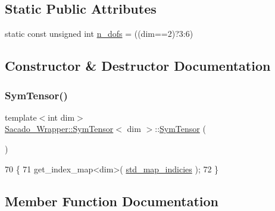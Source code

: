 \subsection*{Static Public Attributes}
\begin{DoxyCompactItemize}
\item 
static const unsigned int \hyperlink{classSacado__Wrapper_1_1SymTensor_a733bc4b029ff8d067b48e7ce3ee7606b}{n\+\_\+dofs} = ((dim==2)?3\+:6)
\end{DoxyCompactItemize}


\subsection{Constructor \& Destructor Documentation}
\mbox{\label{classSacado__Wrapper_1_1SymTensor_a4e7ec32177eb891e3f1a32a16bcd59f5}} 
\subsubsection{\texorpdfstring{Sym\+Tensor()}{SymTensor()}}
{\footnotesize\ttfamily template$<$int dim$>$ \\
\hyperlink{classSacado__Wrapper_1_1SymTensor}{Sacado\+\_\+\+Wrapper\+::\+Sym\+Tensor}$<$ dim $>$\+::\hyperlink{classSacado__Wrapper_1_1SymTensor}{Sym\+Tensor} (\begin{DoxyParamCaption}{ }\end{DoxyParamCaption})\hspace{0.3cm}{\ttfamily [inline]}}


\begin{DoxyCode}
70         \{
71             get\_index\_map<dim>( \hyperlink{classSacado__Wrapper_1_1SymTensor_ae3b1c56cde3fc5c7805b618ef3d9de75}{std\_map\_indicies} );
72         \}
\end{DoxyCode}


\subsection{Member Function Documentation}
\mbox{\label{classSacado__Wrapper_1_1SymTensor_ab97427c3b5cab279e58607cf431ab262}} 

